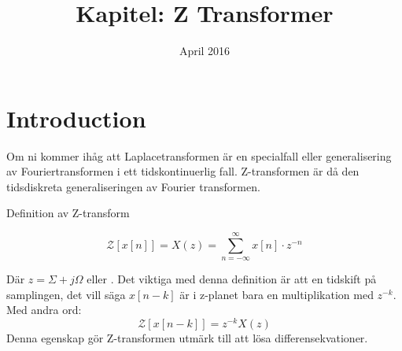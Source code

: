 \documentclass{article}
\title{Kapitel: Z Transformer}
\author{ }
\date{April 2016}
\begin{document}
\maketitle

\section{Introduction}

Om ni kommer ihåg att Laplacetransformen är en specialfall eller generalisering av Fouriertransformen i ett
tidskontinuerlig fall. Z-transformen är då den tidsdiskreta generaliseringen av Fourier transformen.

Definition av Z-transform

$$\mathcal{Z}[x[n]] = X(z) = \sum_{n=-\infty}^{\infty} x[n] \cdot z^{-n} $$

Där $z = \Sigma + j\Omega$ eller .
Det viktiga med denna definition är att en tidskift på samplingen, det vill säga $x[n-k]$ är i
z-planet bara en multiplikation med $z^{-k}$. Med andra ord:
$$\mathcal{Z}[x[n-k]] = z^{-k} X(z) $$ %
Denna egenskap gör Z-transformen utmärk till att lösa differensekvationer.

\appendix
\end{document}
